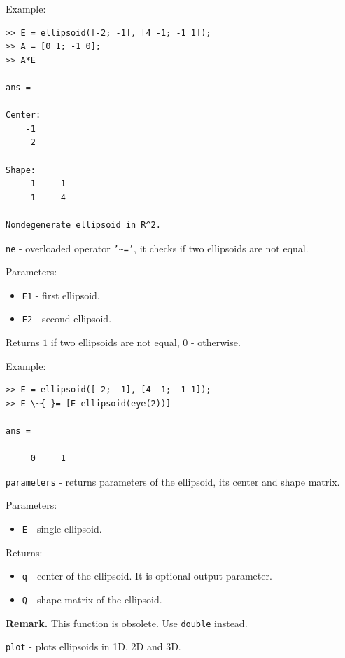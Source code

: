 \documentclass{report}
\begin{document}
Example:
{\tt \begin{verbatim}
>> E = ellipsoid([-2; -1], [4 -1; -1 1]);
>> A = [0 1; -1 0];
>> A*E

ans =

Center:
    -1
     2

Shape:
     1     1
     1     4

Nondegenerate ellipsoid in R^2.
\end{verbatim} }

\newpage

{\Large {\tt ne}} - overloaded operator {\tt '\~{ }='},
it checks if two ellipsoids are not equal.

Parameters:
\begin{itemize}
\item {\tt E1} - first ellipsoid.
\item {\tt E2} - second ellipsoid.
\end{itemize}

Returns $1$ if two ellipsoids are not equal, $0$ - otherwise.

Example:
{\tt \begin{verbatim}
>> E = ellipsoid([-2; -1], [4 -1; -1 1]);
>> E \~{ }= [E ellipsoid(eye(2))]

ans =

     0     1
\end{verbatim} }

\newpage

{\Large {\tt parameters}} - returns parameters of the ellipsoid, its center
and shape matrix.

Parameters:
\begin{itemize}
\item {\tt E} - single ellipsoid.
\end{itemize}

Returns:
\begin{itemize}
\item {\tt q} - center of the ellipsoid. It is optional output parameter.
\item {\tt Q} - shape matrix of the ellipsoid.
\end{itemize}

{\bf Remark.} This function is obsolete. Use {\tt double} instead.

\newpage

{\Large {\tt plot}} - plots ellipsoids in 1D, 2D and 3D.
\end{document}
